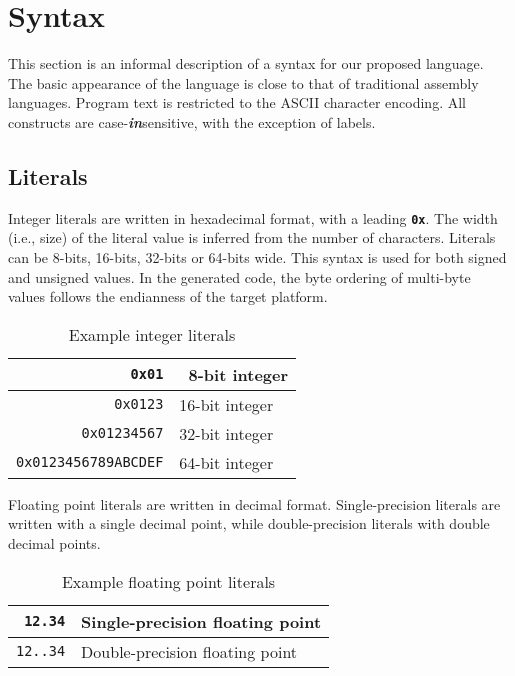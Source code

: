 \section{Syntax}

This section is an informal description
of a syntax for our proposed language.
The basic appearance of the language is close
to that of traditional assembly languages.
Program text is restricted to the ASCII
character encoding. All constructs are case-\emph{\textbf{in}}sensitive,
with the exception of labels.

\subsection{Literals}

Integer literals are written in hexadecimal format, with a leading
\textbf{\texttt{0x}}. The width (i.e., size) of the literal value is
inferred from the number of characters. Literals can be 8-bits, 16-bits,
32-bits or 64-bits wide. This syntax is used for both signed and unsigned values.
In the generated code, the byte ordering of multi-byte values follows the endianness
of the target platform.

\begin{table}[h!]
  \begin{center}
    \begin{tabular}{|r|l|}
      \hline
      \texttt{0x01}               & \ 8-bit integer  \\ \hline
      \texttt{0x0123}             &   16-bit integer \\ \hline
      \texttt{0x01234567}         &   32-bit integer \\ \hline
      \texttt{0x0123456789ABCDEF} &   64-bit integer \\ \hline
    \end{tabular}
  \end{center}
  \caption{Example integer literals}
\end{table}

Floating point literals are written in decimal format. Single-precision literals
are written with a single decimal point, while double-precision
literals with double decimal points.

\begin{table}[h!]
  \begin{center}
    \begin{tabular}{|r|l|}
      \hline
      \texttt{12.34}  & Single-precision floating point \\ \hline
      \texttt{12..34} & Double-precision floating point \\ \hline
    \end{tabular}
  \end{center}
  \caption{Example floating point literals}
\end{table}

